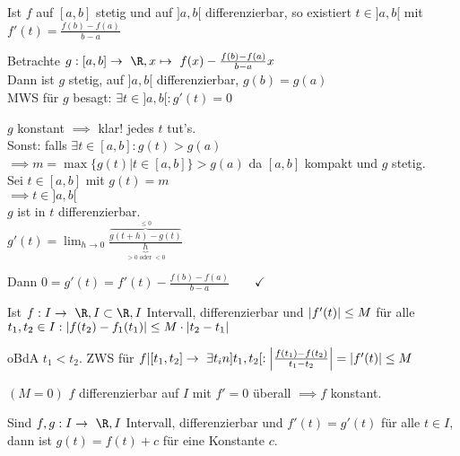 \begin{satz*}[note = Mittelwertsatz (MWS) , index = Mittelwertsatz]
	Ist $f$ auf $[a,b]$ stetig und auf $]a,b[$ differenzierbar, so existiert $t \in ]a,b[$ mit $f'(t) = \frac{f(b) - f(a)}{b-a}$\\
	\begin{bew}
		Betrachte $g: [a,b] \rightarrow \R , x \mapsto f(x) - \frac{f(b)-f(a)}{b-a} x$\\
		Dann ist $g$ stetig, auf $]a,b[$ differenzierbar, $g(b) = g(a)$\\
		MWS für $g$ besagt: $\exists t \in ]a,b[ : g'(t) = 0$\\
		\begin{satz*}[note = Satz von Rolle]
			\begin{bew}
				$g$ konstant $\implies$ klar! jedes $t$ tut's.\\
				Sonst: falls $\exists t \in [a,b] : g(t) > g(a)$\\
				$\implies m = \max\{ g(t) | t \in [a,b] \} > g(a)$ da $[a,b]$ kompakt und $g$ stetig.\\
				Sei $t \in [a,b]$ mit $g(t) = m$\\
				$\implies t\in ]a,b[$\\
				$g$ ist in $t$ differenzierbar.\\
				$g'(t) = \lim_{h \rightarrow 0} \frac{\overbrace{g(t+h) - g(t)}^{\leq 0}}{\underbrace{h}_{> 0 \text{ oder } < 0}}$
			\end{bew}
		\end{satz*}
		Dann $0 = g'(t) = f'(t) - \frac{f(b)-f(a)}{b-a} \qquad \checkmark$\\
		\begin{folge}
			Ist $f: I \rightarrow \R, I \subset \R, I$ Intervall, differenzierbar und $\abs{f'(t)} \leq M$ für alle $t_1 , t_2 \in I: \abs{f(t_2)-f_1(t_1)} \leq M \cdot \abs{t_2-t_1}$\\
			\begin{bew}
				oBdA $t_1 < t_2$. ZWS für $f|[t_1,t_2] \rightarrow \exists t _in ]t_1,t_2[ : \abs{\frac{f(t_1)-f(t_2)}{t_1-t_2}} = \abs{f'(t)} \leq M$
			\end{bew}
		\end{folge}
		\begin{folge}
			$(M=0)$ $f$ differenzierbar auf $I$ mit $f' = 0$ überall $\implies f$ konstant.
		\end{folge}
		\begin{folge}
			Sind $f, g : I \rightarrow \R , I$ Intervall, differenzierbar und $f'(t) = g'(t)$ für alle $t \in I$, dann ist $g(t) = f(t) + c$ für eine Konstante $c$.
		\end{folge}
	\end{bew}
\end{satz*}
